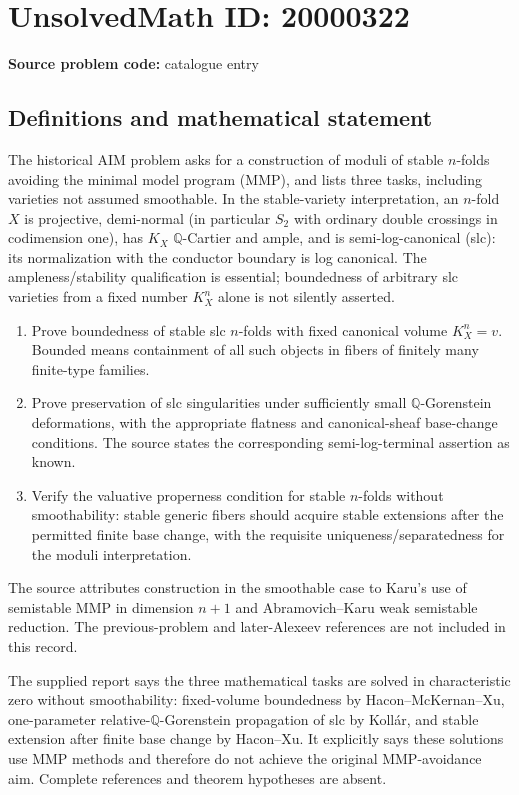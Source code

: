 \documentclass[11pt]{article}
\newcommand{\Q}{\mathbb{Q}}
\begin{document}
\section*{UnsolvedMath ID: 20000322}
\textbf{Source problem code:} catalogue entry
\subsection{Definitions and mathematical statement}
The historical AIM problem asks for a construction of moduli of stable $n$-folds avoiding the minimal model program (MMP), and lists three tasks, including varieties not assumed smoothable. In the stable-variety interpretation, an $n$-fold $X$ is projective, demi-normal (in particular $S_2$ with ordinary double crossings in codimension one), has $K_X$ $\Q$-Cartier and ample, and is semi-log-canonical (slc): its normalization with the conductor boundary is log canonical. The ampleness/stability qualification is essential; boundedness of arbitrary slc varieties from a fixed number $K_X^n$ alone is not silently asserted.
\begin{enumerate}
\item Prove boundedness of stable slc $n$-folds with fixed canonical volume $K_X^n=v$. Bounded means containment of all such objects in fibers of finitely many finite-type families.
\item Prove preservation of slc singularities under sufficiently small $\Q$-Gorenstein deformations, with the appropriate flatness and canonical-sheaf base-change conditions. The source states the corresponding semi-log-terminal assertion as known.
\item Verify the valuative properness condition for stable $n$-folds without smoothability: stable generic fibers should acquire stable extensions after the permitted finite base change, with the requisite uniqueness/separatedness for the moduli interpretation.
\end{enumerate}
The source attributes construction in the smoothable case to Karu's use of semistable MMP in dimension $n+1$ and Abramovich--Karu weak semistable reduction. The previous-problem and later-Alexeev references are not included in this record.

The supplied report says the three mathematical tasks are solved in characteristic zero without smoothability: fixed-volume boundedness by Hacon--McKernan--Xu, one-parameter relative-$\Q$-Gorenstein propagation of slc by Koll\'ar, and stable extension after finite base change by Hacon--Xu. It explicitly says these solutions use MMP methods and therefore do not achieve the original MMP-avoidance aim. Complete references and theorem hypotheses are absent.
\end{document}
